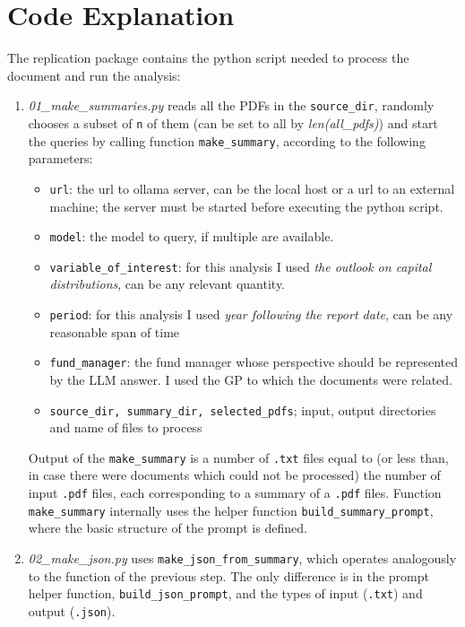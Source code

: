 \documentclass[12pt,a4paper]{report}
\begin{document}
\section{Code Explanation}\label{sec:code-explanation}
    The replication package contains the python script needed to process the document and run the analysis:
    \begin{enumerate}
        \item \textit{01\_make\_summaries.py} reads all the PDFs in the \texttt{source\_dir}, randomly chooses a subset of \texttt{n} of them (can be set to all by \textit{len(all\_pdfs)}) and start the queries by calling function \texttt{make\_summary}, according to the following parameters:
        \begin{itemize}
            \item \texttt{url}: the url to ollama server, can be the local host or a url to an external machine; the server must be started before executing the python script.
            \item \texttt{model}: the model to query, if multiple are available.
            \item \texttt{variable\_of\_interest}: for this analysis I used \textit{the outlook on capital distributions}, can be any relevant quantity.
            \item \texttt{period}: for this analysis I used \textit{year following the report date}, can be any reasonable span of time
            \item \texttt{fund\_manager}: the fund manager whose perspective should be represented by the LLM answer.
            I used the GP to which the documents were related.
            \item \texttt{source\_dir, summary\_dir, selected\_pdfs}; input, output directories and name of files to process
        \end{itemize}
        Output of the \texttt{make\_summary} is a number of \texttt{.txt} files equal to (or less than, in case there were documents which could not be processed) the number of input \texttt{.pdf} files, each corresponding to a summary of a \texttt{.pdf} files.
        Function \texttt{make\_summary} internally uses the helper function \texttt{build\_summary\_prompt}, where the basic structure of the prompt is defined.
        \item \textit{02\_make\_json.py} uses \texttt{make\_json\_from\_summary}, which operates analogously to the function of the previous step.
        The only difference is in the prompt helper function, \texttt{build\_json\_prompt}, and the types of input (\texttt{.txt}) and output (\texttt{.json}).

\end{enumerate}
\end{document}
